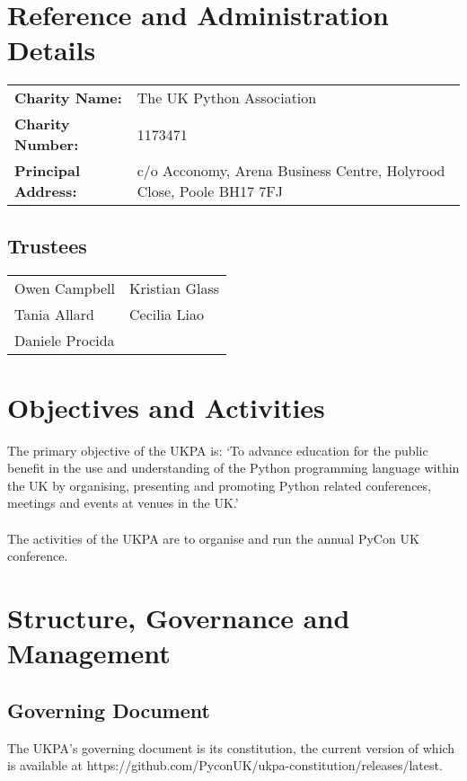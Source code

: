 \documentclass[11pt, final]{article}
\begin{document}

    \section{Reference and Administration Details}
    \begin{tabular}{l l}
        \textbf{Charity Name:} & The UK Python Association \\
        \textbf{Charity Number:} & 1173471 \\
        \textbf{Principal Address:} & c/o Acconomy, Arena Business Centre, Holyrood Close, Poole BH17 7FJ\\
    \end{tabular}

        \subsection{Trustees}
        \begin{tabular}{l l}
            Owen Campbell & Kristian Glass\\
            Tania Allard & Cecilia Liao\\
            Daniele Procida &\\
        \end{tabular}
        
    \section{Objectives and Activities}
    The primary objective of the UKPA is: `To advance education for the public benefit in the use and understanding of the Python programming language within the UK by organising, presenting and promoting Python related conferences, meetings and events at venues in the UK.'\\
    \\
    The activities of the UKPA are to organise and run the annual PyCon UK conference.

    \section{Structure, Governance and Management}

        \subsection{Governing Document}
        The UKPA's governing document is its constitution, the current version of which is available at https://github.com/PyconUK/ukpa-constitution/releases/latest. 
\end{document}

